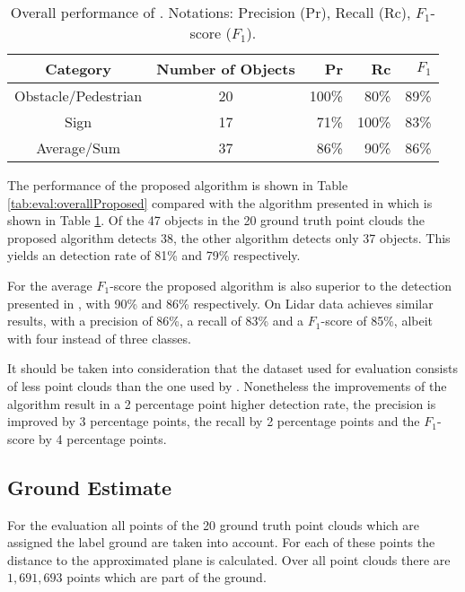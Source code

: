 \begin{table}[h!]
    \centering
    \begin{tabular}{c|c|rrr}
        \toprule
        Category & Number of Objects & Pr & Rc & $F_1$\\
        \midrule
        Obstacle/Pedestrian & 20 & 100\% & 80\% & 89\% \\
        Sign & 17 & 71\% & 100\% & 83\% \\
        \midrule
        Average/Sum & 37 & 86\% & 90\% & 86\% \\
        \bottomrule
    \end{tabular}
    \caption{Overall performance of \cite{AttBen17}. Notations: Precision (Pr), Recall (Rc), $F_1$-score ($F_1$).}
    \label{tab:eval:overallBnb}
\end{table}

The performance of the proposed algorithm is shown in Table \ref{tab:eval:overallProposed} compared with the algorithm presented in \cite{AttBen17} which is shown in Table \ref{tab:eval:overallBnb}. 
Of the 47 objects in the 20 ground truth point clouds the proposed algorithm detects 38, the other algorithm detects only 37 objects. This yields an detection rate of 81\% and 79\% respectively.

For the average $F_1$-score the proposed algorithm is also superior to the detection presented in \cite{AttBen17}, with 90\% and 86\% respectively. On Lidar data \cite{AttBen17} achieves similar results, with a precision of 86\%, a recall of 83\% and a $F_1$-score of 85\%, albeit with four instead of three classes.

It should be taken into consideration that the dataset used for evaluation consists of less point clouds than the one used by \cite{AttBen17}.
Nonetheless the improvements of the algorithm result in a 2 percentage point higher detection rate, the precision is improved by 3 percentage points, the recall by 2 percentage points and the $F_1$-score by 4 percentage points.

\subsection{Ground Estimate}
For the evaluation all points of the 20 ground truth point clouds which are assigned the label ground are taken into account.
For each of these points the distance to the approximated plane is calculated.
Over all point clouds there are $1,691,693$ points which are part of the ground.

